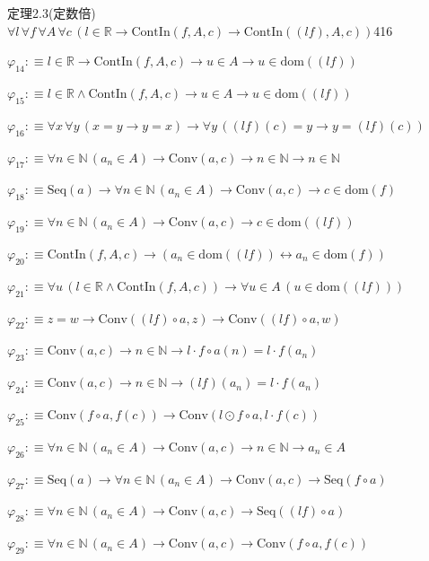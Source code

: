 \begin{fullproof}{定理2.3(定数倍)}{$\forall l\,\forall f\,\forall A\,\forall c\,(l \in \mathbb{R} \to \mathrm{ContIn}(f,A,c) \to \mathrm{ContIn}((l f),A,c))$}{416}
\begin{abbrevlist}
\item $\varphi_{14} :\equiv l \in \mathbb{R} \to \mathrm{ContIn}(f,A,c) \to u \in A \to u \in \mathrm{dom}((l f))$
\item $\varphi_{15} :\equiv l \in \mathbb{R} \land \mathrm{ContIn}(f,A,c) \to u \in A \to u \in \mathrm{dom}((l f))$
\item $\varphi_{16} :\equiv \forall x\,\forall y\,(x = y \to y = x) \to \forall y\,((l f)(c) = y \to y = (l f)(c))$
\item $\varphi_{17} :\equiv \forall n \in \mathbb{N}\,(a_{n} \in A) \to \mathrm{Conv}(a,c) \to n \in \mathbb{N} \to n \in \mathbb{N}$
\item $\varphi_{18} :\equiv \mathrm{Seq}(a) \to \forall n \in \mathbb{N}\,(a_{n} \in A) \to \mathrm{Conv}(a,c) \to c \in \mathrm{dom}(f)$
\item $\varphi_{19} :\equiv \forall n \in \mathbb{N}\,(a_{n} \in A) \to \mathrm{Conv}(a,c) \to c \in \mathrm{dom}((l f))$
\item $\varphi_{20} :\equiv \mathrm{ContIn}(f,A,c) \to (a_{n} \in \mathrm{dom}((l f)) \leftrightarrow a_{n} \in \mathrm{dom}(f))$
\item $\varphi_{21} :\equiv \forall u\,(l \in \mathbb{R} \land \mathrm{ContIn}(f,A,c)) \to \forall u \in A\,(u \in \mathrm{dom}((l f)))$
\item $\varphi_{22} :\equiv z = w \to \mathrm{Conv}((l f) \circ a,z) \to \mathrm{Conv}((l f) \circ a,w)$
\item $\varphi_{23} :\equiv \mathrm{Conv}(a,c) \to n \in \mathbb{N} \to l \cdot f \circ a(n) = l \cdot f(a_{n})$
\item $\varphi_{24} :\equiv \mathrm{Conv}(a,c) \to n \in \mathbb{N} \to (l f)(a_{n}) = l \cdot f(a_{n})$
\item $\varphi_{25} :\equiv \mathrm{Conv}(f \circ a,f(c)) \to \mathrm{Conv}(l \odot f \circ a,l \cdot f(c))$
\item $\varphi_{26} :\equiv \forall n \in \mathbb{N}\,(a_{n} \in A) \to \mathrm{Conv}(a,c) \to n \in \mathbb{N} \to a_{n} \in A$
\item $\varphi_{27} :\equiv \mathrm{Seq}(a) \to \forall n \in \mathbb{N}\,(a_{n} \in A) \to \mathrm{Conv}(a,c) \to \mathrm{Seq}(f \circ a)$
\item $\varphi_{28} :\equiv \forall n \in \mathbb{N}\,(a_{n} \in A) \to \mathrm{Conv}(a,c) \to \mathrm{Seq}((l f) \circ a)$
\item $\varphi_{29} :\equiv \forall n \in \mathbb{N}\,(a_{n} \in A) \to \mathrm{Conv}(a,c) \to \mathrm{Conv}(f \circ a,f(c))$

\end{abbrevlist}
\end{fullproof}
